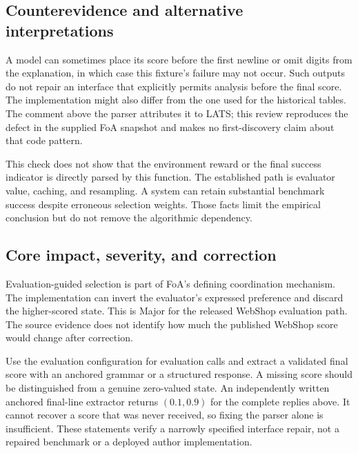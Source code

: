 \documentclass[10pt]{article}
\begin{document}
\subsection*{Counterevidence and alternative interpretations}
A model can sometimes place its score before the first newline or omit digits from the explanation, in which case this fixture’s failure may not occur. Such outputs do not repair an interface that explicitly permits analysis before the final score. The implementation might also differ from the one used for the historical tables. The comment above the parser attributes it to LATS; this review reproduces the defect in the supplied FoA snapshot and makes no first-discovery claim about that code pattern.\par
This check does not show that the environment reward or the final success indicator is directly parsed by this function. The established path is evaluator value, caching, and resampling. A system can retain substantial benchmark success despite erroneous selection weights. Those facts limit the empirical conclusion but do not remove the algorithmic dependency.\par
\subsection*{Core impact, severity, and correction}
Evaluation-guided selection is part of FoA’s defining coordination mechanism. The implementation can invert the evaluator’s expressed preference and discard the higher-scored state. This is Major for the released WebShop evaluation path. The source evidence does not identify how much the published WebShop score would change after correction.\par
Use the evaluation configuration for evaluation calls and extract a validated final score with an anchored grammar or a structured response. A missing score should be distinguished from a genuine zero-valued state. An independently written anchored final-line extractor returns \((0.1,0.9)\) for the complete replies above. It cannot recover a score that was never received, so fixing the parser alone is insufficient. These statements verify a narrowly specified interface repair, not a repaired benchmark or a deployed author implementation.\par
\end{document}
